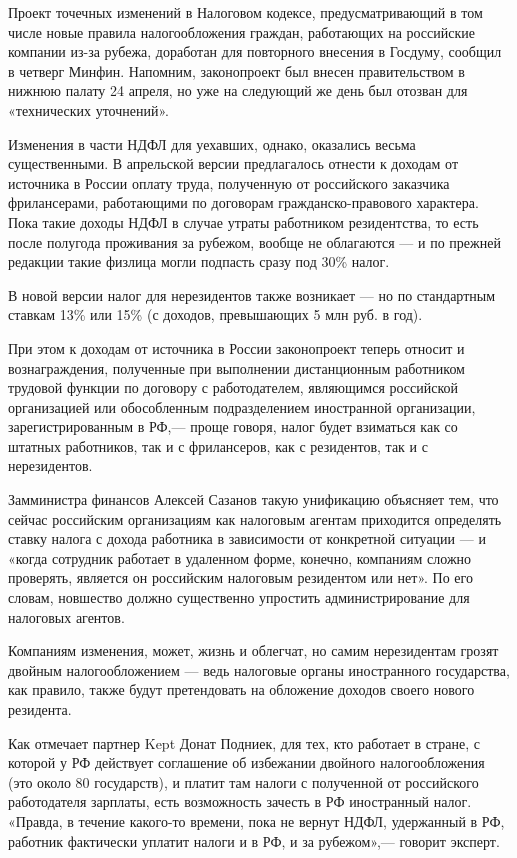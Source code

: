 Проект точечных изменений в Налоговом кодексе, предусматривающий в том числе новые правила налогообложения граждан, работающих на российские компании из-за рубежа, доработан для повторного внесения в Госдуму, сообщил в четверг Минфин. Напомним, законопроект был внесен правительством в нижнюю палату 24 апреля, но уже на следующий же день был отозван для «технических уточнений».

Изменения в части НДФЛ для уехавших, однако, оказались весьма существенными. В апрельской версии предлагалось отнести к доходам от источника в России оплату труда, полученную от российского заказчика фрилансерами, работающими по договорам гражданско-правового характера. Пока такие доходы НДФЛ в случае утраты работником резидентства, то есть после полугода проживания за рубежом, вообще не облагаются — и по прежней редакции такие физлица могли подпасть сразу под 30\% налог.

\begin{fancyquotes}
    В новой версии налог для нерезидентов также возникает — но по стандартным ставкам 13\% или 15\% (с доходов, превышающих 5 млн руб. в год).
\end{fancyquotes}

При этом к доходам от источника в России законопроект теперь относит и вознаграждения, полученные при выполнении дистанционным работником трудовой функции по договору с работодателем, являющимся российской организацией или обособленным подразделением иностранной организации, зарегистрированным в РФ,— проще говоря, налог будет взиматься как со штатных работников, так и с фрилансеров, как с резидентов, так и с нерезидентов.

Замминистра финансов Алексей Сазанов такую унификацию объясняет тем, что сейчас российским организациям как налоговым агентам приходится определять ставку налога с дохода работника в зависимости от конкретной ситуации — и «когда сотрудник работает в удаленном форме, конечно, компаниям сложно проверять, является он российским налоговым резидентом или нет». По его словам, новшество должно существенно упростить администрирование для налоговых агентов.

\begin{fancyquotes}
    Компаниям изменения, может, жизнь и облегчат, но самим нерезидентам грозят двойным налогообложением — ведь налоговые органы иностранного государства, как правило, также будут претендовать на обложение доходов своего нового резидента.
\end{fancyquotes}

Как отмечает партнер Kept Донат Подниек, для тех, кто работает в стране, с которой у РФ действует соглашение об избежании двойного налогообложения (это около 80 государств), и платит там налоги с полученной от российского работодателя зарплаты, есть возможность зачесть в РФ иностранный налог. «Правда, в течение какого-то времени, пока не вернут НДФЛ, удержанный в РФ, работник фактически уплатит налоги и в РФ, и за рубежом»,— говорит эксперт.

